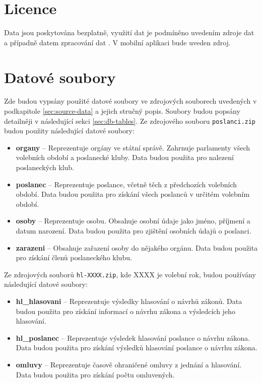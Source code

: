 \section{Licence}

Data jsou poskytována bezplatně, využití dat je podmíněno uvedením zdroje dat a případně datem zpracování dat \cite{psp-data}. V mobilní aplikaci bude uveden zdroj.

\section{Datové soubory}

Zde budou vypsány použité datové soubory ve zdrojových souborech uvedených v podkapitole \ref{sec:source-data} a jejich stručný popis. Soubory budou popsány detailněji v následující sekci \ref{sec:db-tables}. Ze zdrojového souboru \lstinline|poslanci.zip| budou použity následující datové soubory:

\begin{itemize}
	\item \textbf{organy} -- Reprezentuje orgány ve státní správě. Zahrnuje parlamenty všech volebních období a poslanecké kluby. Data budou použita pro nalezení poslaneckých klub.
	
	\item \textbf{poslanec} -- Reprezentuje poslance, včetně těch z předchozích volebních období. Data budou použita pro získání všech poslanců v určitém volebním období.
	
	\item \textbf{osoby} -- Reprezentuje osobu. Obsahuje osobní údaje jako jméno, příjmení a datum narození. Data budou použita pro zjištění osobních údajů o poslanci.
	
	\item \textbf{zarazeni} -- Obsahuje zařazení osoby do nějakého orgánu. Data budou použita pro získání členů poslaneckého klubu.
\end{itemize}

\noindent Ze zdrojových souborů \lstinline|hl-XXXX.zip|, kde XXXX je volební rok, budou používány následující datové soubory:

\begin{itemize}
	\item \textbf{hl\_hlasovani} -- Reprezentuje výsledky hlasování o návrhů zákonů. Data budou použita pro získání informací o návrhu zákona a výsledcích jeho hlasování.
	
	\item \textbf{hl\_poslanec} -- Reprezentuje výsledek hlasování poslance o návrhu zákona. Data budou použita pro získání výsledků hlasování poslance o návrhu zákona.
	
	\item \textbf{omluvy} -- Reprezentuje časově ohraničené omluvy z jednání a hlasování. Data budou použita pro získání počtu omluvených. 
\end{itemize}

